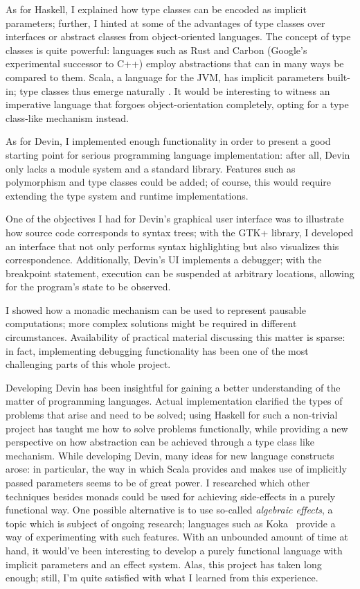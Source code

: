 \documentclass[UdineBachThesis,american,11pt]{PhdThesis}
\begin{document}
  As for Haskell, I explained how type classes can be encoded as implicit
  parameters; further, I hinted at some of the advantages of type classes over
  interfaces or abstract classes from object-oriented languages. The concept of
  type classes is quite powerful: languages such as Rust and Carbon (Google's
  experimental successor to C++) employ abstractions that can in many ways be
  compared to them. Scala, a language for the JVM, has implicit parameters
  built-in; type classes thus emerge naturally \cite{scala-type-classes}. It
  would be interesting to witness an imperative language that forgoes
  object-orientation completely, opting for a type class-like mechanism instead.

  As for Devin, I implemented enough functionality in order to present a good
  starting point for serious programming language implementation: after all,
  Devin only lacks a module system and a standard library. Features such as
  polymorphism and type classes could be added; of course, this would require
  extending the type system and runtime implementations.

  One of the objectives I had for Devin's graphical user interface was to
  illustrate how source code corresponds to syntax trees; with the GTK+ library,
  I developed an interface that not only performs syntax highlighting but also
  visualizes this correspondence. Additionally, Devin's UI implements a
  debugger; with the breakpoint statement, execution can be suspended at
  arbitrary locations, allowing for the program's state to be observed.

  I showed how a monadic mechanism can be used to represent pausable
  computations; more complex solutions might be required in different
  circumstances. Availability of practical material discussing this matter is
  sparse: in fact, implementing debugging functionality has been one of the most
  challenging parts of this whole project.

  Developing Devin has been insightful for gaining a better understanding of the
  matter of programming languages. Actual implementation clarified the types of
  problems that arise and need to be solved; using Haskell for such a
  non-trivial project has taught me how to solve problems functionally, while
  providing a new perspective on how abstraction can be achieved through a type
  class like mechanism. While developing Devin, many ideas for new language
  constructs arose: in particular, the way in which Scala provides and makes use
  of implicitly passed parameters seems to be of great power. I researched which
  other techniques besides monads could be used for achieving side-effects in a
  purely functional way. One possible alternative is to use so-called
  \emph{algebraic effects}, a topic which is subject of ongoing research;
  languages such as Koka~\cite{koka} provide a way of experimenting with such
  features. With an unbounded amount of time at hand, it would've been
  interesting to develop a purely functional language with implicit parameters
  and an effect system. Alas, this project has taken long enough; still, I'm
  quite satisfied with what I learned from this experience.
\end{document}
